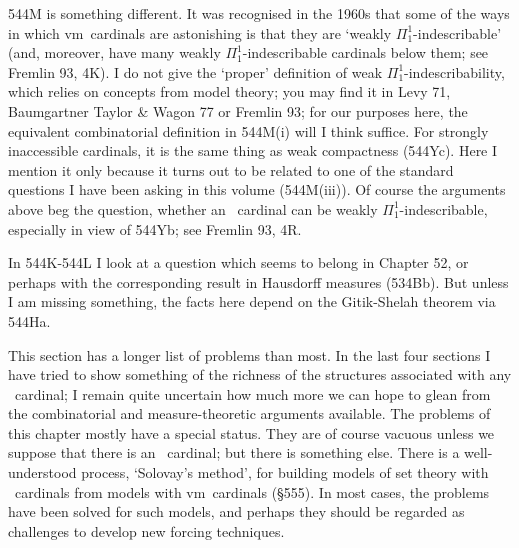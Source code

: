 {544M is something different.
It was recognised in the 1960s that some of the ways in which \2vm\
cardinals are astonishing is that they are
`weakly $\Pi^1_1$-indescribable' (and, moreover, have many
weakly $\Pi^1_1$-indescribable cardinals below them;  see
{\smc Fremlin 93}, 4K).   I do
not give the `proper' definition of weak $\Pi^1_1$-indescribability, which
relies on concepts from model theory;  you may find it in {\smc Levy 71},
{\smc Baumgartner Taylor \& Wagon 77} or {\smc Fremlin 93};  for our
purposes here, the equivalent combinatorial definition in 544M(i) will
I think suffice.   For strongly inaccessible cardinals, it is the same
thing as weak compactness (544Yc).   Here I mention it only because it
turns out to be related to one of the standard questions I have been asking
in this volume (544M(iii)).   Of course the arguments above beg the
question, whether an \am\ cardinal can be weakly $\Pi^1_1$-indescribable,
especially in view of 544Yb;  see {\smc Fremlin 93}, 4R.

In 544K-544L I look at a question which seems to belong in Chapter 52,
or perhaps with the corresponding result in Hausdorff measures (534Bb).
But unless I am missing something,
the facts here depend on the Gitik-Shelah theorem via 544Ha.

This section has a longer list of problems than most.   In the last four
sections I have tried
to show something of the richness of the structures associated with any
\am\ cardinal;  I remain quite uncertain how much more we can hope to glean
from the combinatorial and measure-theoretic arguments available.
The problems of this chapter mostly have a special status.   They are
of course vacuous unless we suppose that there is an \am\ cardinal;  but
there is something else.   There is a well-understood process,
`Solovay's method', for building
models of set theory with \am\ cardinals from models with
\2vm\ cardinals (\S555).
In most cases, the problems have been solved for such models, and perhaps
they should be regarded as challenges to develop new forcing techniques.
}%

\discrpage




